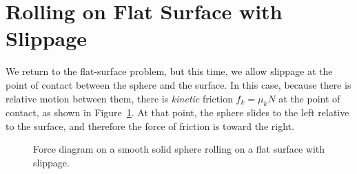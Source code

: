 \documentclass{../../oss-handout}
\begin{document}
\section{Rolling on Flat Surface with Slippage}

We return to the flat-surface problem, but this time, we allow slippage at the
point of contact between the sphere and the surface. In this case, because there
is relative motion between them, there is \emph{kinetic} friction $f_k=\mu_kN$
at the point of contact, as shown in Figure~\ref{slip1}. At that point, the
sphere slides to the left relative to the surface, and therefore the force of
friction is toward the right.
\begin{figure}[!ht]
  \centering
  \caption{Force diagram on a smooth solid sphere rolling on a flat surface with
    slippage.}
  \label{slip1}
\end{figure}
\end{document}
